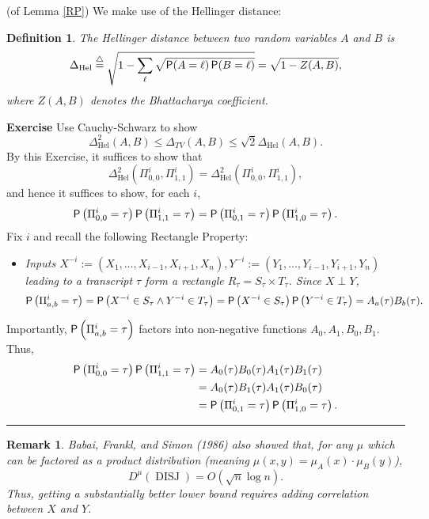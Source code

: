 \documentclass[twoside]{article}
\newcounter{tnum}
\newtheorem{definition}[tnum]{Definition}
\newtheorem{remark}[tnum]{Remark}
\newenvironment{proof}{{\bf Proof:}}{\hfill\rule{2mm}{2mm}}
\newcommand\pr{\operatornamewithlimits{\mathsf{P}}}
\newcommand\disj{\operatorname{DISJ}}
\newcommand\Hel{\operatorname{Hel}}
\begin{document}
\begin{proof}
(of Lemma \ref{RP}) We make use of the Hellinger distance:
\begin{definition}
The Hellinger distance between two random variables $A$ and $B$ is
\[\Delta_{\Hel}
    \buildrel\triangle\over =
        \sqrt{1 - \sum_\ell \sqrt{\pr(A = \ell) \pr(B = \ell)}}
    = \sqrt{1 - Z(A,B)},
\]
where $Z(A,B)$ denotes the Bhattacharya coefficient.
\end{definition}
{\bf Exercise} Use Cauchy-Schwarz to show
\[\Delta^2_{\Hel}(A,B) \leq \Delta_{TV}(A,B) \leq \sqrt2\Delta_{\Hel}(A,B).\]
By this Exercise, it suffices to show that
\[
\Delta_{\Hel}^2(\Pi_{0,0}^i,\Pi_{1,1}^i)
 = \Delta_{\Hel}^2(\Pi_{0,0}^i,\Pi_{1,1}^i),
\]
and hence it suffices to show, for each $i$,
\[\pr \left( \Pi_{0,0}^i = \tau \right) \pr \left( \Pi_{1,1}^i = \tau \right)
  = \pr \left( \Pi_{0,1}^i = \tau \right) \pr \left( \Pi_{1,0}^i = \tau \right)
.\]
Fix $i$ and recall the following Rectangle Property:
\vspace{-0.1in}
\begin{itemize}
\item  \emph{Inputs $X^{-i} := (X_1, \dots, X_{i - 1}, X_{i + 1}, X_n),
Y^{-i} := (Y_1, \dots, Y_{i - 1}, Y_{i + 1}, Y_n)$ leading to a transcript
$\tau$ form a rectangle $R_\tau = S_\tau \times T_\tau$. Since $X \perp Y$,}
\begin{align*}
\pr \left( \Pi_{a,b}^i = \tau \right)
    = \pr\left( X^{-i} \in S_\tau \wedge Y^{-i} \in T_\tau \right)
    = \pr\left( X^{-i} \in S_\tau \right) \pr \left( Y^{-i} \in T_\tau \right)
    = A_a(\tau)B_b(\tau).
\end{align*}
\end{itemize}
\vspace{-0.1in}
Importantly, $\pr \left( \Pi_{a,b}^i = \tau \right)$ factors into non-negative
functions $A_0,A_1,B_0,B_1$. Thus,
\begin{align*}
\pr \left( \Pi_{0,0}^i = \tau \right)
    \pr \left( \Pi_{1,1}^i = \tau \right)
 & = A_0(\tau)B_0(\tau)A_1(\tau)B_1(\tau)   \\
 & = A_0(\tau)B_1(\tau)A_1(\tau)B_0(\tau)   \\
 & = \pr \left( \Pi_{0,1}^i = \tau \right)
        \pr \left( \Pi_{1,0}^i = \tau \right).
\end{align*}
\end{proof}

\begin{remark}
Babai, Frankl, and Simon (1986) also showed that, for any $\mu$ which can be
factored as a product distribution (meaning
$\mu(x,y) = \mu_{A}(x) \cdot \mu_B(y)$),
\[D^\mu(\disj) = O(\sqrt n \log n).\]
Thus, getting a substantially better lower bound requires adding correlation
between $X$ and $Y$.
\end{remark}
\vspace{-0.2in}
\end{document}
